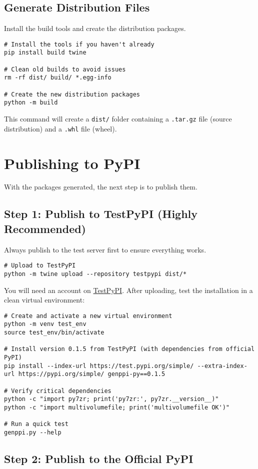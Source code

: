 \documentclass[11pt, a4paper]{article}
\begin{document}
\subsection{Generate Distribution Files}
Install the build tools and create the distribution packages.
\begin{lstlisting}[style=bashstyle]
# Install the tools if you haven't already
pip install build twine

# Clean old builds to avoid issues
rm -rf dist/ build/ *.egg-info

# Create the new distribution packages
python -m build
\end{lstlisting}
This command will create a \texttt{dist/} folder containing a \texttt{.tar.gz} file (source distribution) and a \texttt{.whl} file (wheel).

\section{Publishing to PyPI}
With the packages generated, the next step is to publish them.

\subsection{Step 1: Publish to TestPyPI (Highly Recommended)}
Always publish to the test server first to ensure everything works.
\begin{lstlisting}[style=bashstyle]
# Upload to TestPyPI
python -m twine upload --repository testpypi dist/*
\end{lstlisting}
You will need an account on \href{https://test.pypi.org/}{TestPyPI}. After uploading, test the installation in a clean virtual environment:
\begin{lstlisting}[style=bashstyle]
# Create and activate a new virtual environment
python -m venv test_env
source test_env/bin/activate

# Install version 0.1.5 from TestPyPI (with dependencies from official PyPI)
pip install --index-url https://test.pypi.org/simple/ --extra-index-url https://pypi.org/simple/ genppi-py==0.1.5

# Verify critical dependencies
python -c "import py7zr; print('py7zr:', py7zr.__version__)"
python -c "import multivolumefile; print('multivolumefile OK')"

# Run a quick test
genppi.py --help
\end{lstlisting}

\subsection{Step 2: Publish to the Official PyPI}
\end{document}
